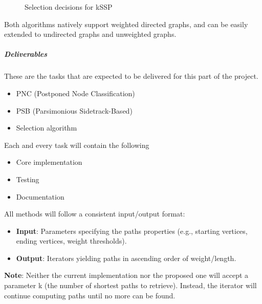 \begin{figure}[ht]
    \centering

    \caption{Selection decisions for kSSP}
\end{figure}

Both algorithms natively support weighted directed graphs, and can be easily
extended to undirected graphs and unweighted graphs.

\subparagraph{Deliverables}
These are the tasks that are expected to be delivered for this part of the
project.

\begin{itemize}
    \item PNC (Postponed Node Classification)
    \item PSB (Parsimonious Sidetrack-Based)
    \item Selection algorithm
\end{itemize}

Each and every task will contain the following

\begin{itemize}
    \item Core implementation
    \item Testing
    \item Documentation
\end{itemize}

All methods will follow a consistent input/output format:
\begin{itemize}
    \item \textbf{Input}: Parameters specifying the paths properties (e.g., starting vertices, ending vertices, weight thresholds).
    \item \textbf{Output}: Iterators yielding paths in ascending order of weight/length.
\end{itemize}

\textbf{Note}: Neither the current implementation nor the proposed one will accept a
parameter k (the number of shortest paths to retrieve). Instead, the iterator
will continue computing paths until no more can be found.

